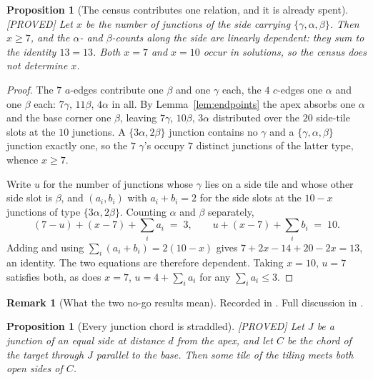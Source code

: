 \documentclass[11pt,reqno]{amsart}
\theoremstyle{plain}
\newtheorem{proposition}[theorem]{Proposition}
\theoremstyle{definition}
\newtheorem{remark}[theorem]{Remark}
\newcommand{\lab}[1]{\hfill\textnormal{\footnotesize\textsc{[#1]}}}
\begin{document}
\begin{proposition}[The census contributes one relation, and it is already spent]\label{prop:nogocensus}\lab{PROVED}
Let $x$ be the number of junctions of the side carrying $\{\gamma,\alpha,\beta\}$. Then $x\ge7$, and
the $\alpha$- and $\beta$-counts along the side are linearly dependent: they sum to the identity
$13=13$. Both $x=7$ and $x=10$ occur in solutions, so the census does not determine $x$.
\end{proposition}

\begin{proof}
The $7$ $a$-edges contribute one $\beta$ and one $\gamma$ each, the $4$ $c$-edges one $\alpha$ and
one $\beta$ each: $7\gamma$, $11\beta$, $4\alpha$ in all. By Lemma~\ref{lem:endpoints} the apex
absorbs one $\alpha$ and the base corner one $\beta$, leaving $7\gamma$, $10\beta$, $3\alpha$
distributed over the $20$ side-tile slots at the $10$ junctions. A $\{3\alpha,2\beta\}$ junction
contains no $\gamma$ and a $\{\gamma,\alpha,\beta\}$ junction exactly one, so the $7$ $\gamma$'s
occupy $7$ distinct junctions of the latter type, whence $x\ge7$.

Write $u$ for the number of junctions whose $\gamma$ lies on a side tile and whose other side slot is
$\beta$, and $(a_i,b_i)$ with $a_i+b_i=2$ for the side slots at the $10-x$ junctions of type
$\{3\alpha,2\beta\}$. Counting $\alpha$ and $\beta$ separately,
\[
(7-u)+(x-7)+\textstyle\sum_i a_i \;=\;3,
\qquad
u+(x-7)+\textstyle\sum_i b_i \;=\;10 .
\]
Adding and using $\sum_i(a_i+b_i)=2(10-x)$ gives $7+2x-14+20-2x=13$, an identity. The two equations
are therefore dependent. Taking $x=10$, $u=7$ satisfies both, as does $x=7$, $u=4+\sum_i a_i$ for any
$\sum_i a_i\le3$.
\end{proof}

\begin{remark}[What the two no-go results mean]\label{rem:nogoscope}
Recorded in \cite{Obstructions}. Full discussion in \cite{Obstructions}.
\end{remark}

\begin{proposition}[Every junction chord is straddled]\label{prop:straddle}\lab{PROVED}
Let $J$ be a junction of an equal side at distance $d$ from the apex, and let $C$ be the chord of the
target through $J$ parallel to the base. Then some tile of the tiling meets both open sides of $C$.
\end{proposition}
\end{document}

